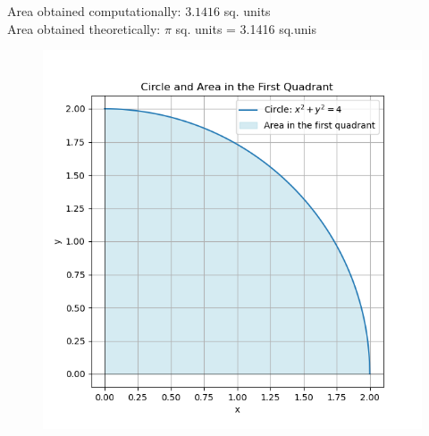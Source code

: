 \documentclass[journal]{IEEEtran}
\begin{document}
Area obtained computationally: $3.1416$ sq. units\\
Area obtained theoretically: $\pi$ sq. units = 3.1416 sq.unis
\begin{figure}[h!]
   \centering
   \includegraphics[width=1\columnwidth]{figs/Fig.png}
\end{figure}
\end{document}
